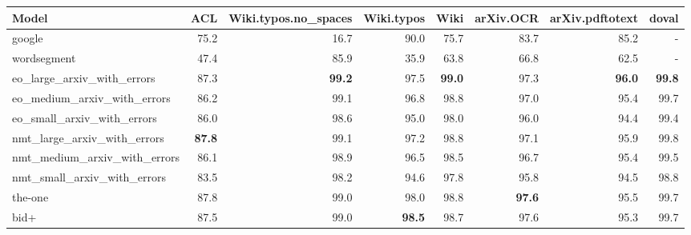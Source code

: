 \begin{tabular}{lrrrrrrr} \hline
Model & ACL & Wiki.typos.no\_spaces & Wiki.typos & Wiki & arXiv.OCR & arXiv.pdftotext & doval \\ \hline
google & 75.2 & 16.7 & 90.0 & 75.7 & 83.7 & 85.2 & - \\ 
wordsegment & 47.4 & 85.9 & 35.9 & 63.8 & 66.8 & 62.5 & - \\ \hline
eo\_large\_arxiv\_with\_errors & 87.3 & \textbf{99.2} & 97.5 & \textbf{99.0} & 97.3 & \textbf{96.0} & \textbf{99.8} \\ 
eo\_medium\_arxiv\_with\_errors & 86.2 & 99.1 & 96.8 & 98.8 & 97.0 & 95.4 & 99.7 \\ 
eo\_small\_arxiv\_with\_errors & 86.0 & 98.6 & 95.0 & 98.0 & 96.0 & 94.4 & 99.4 \\ \hline
nmt\_large\_arxiv\_with\_errors & \textbf{87.8} & 99.1 & 97.2 & 98.8 & 97.1 & 95.9 & 99.8 \\ 
nmt\_medium\_arxiv\_with\_errors & 86.1 & 98.9 & 96.5 & 98.5 & 96.7 & 95.4 & 99.5 \\ 
nmt\_small\_arxiv\_with\_errors & 83.5 & 98.2 & 94.6 & 97.8 & 95.8 & 94.5 & 98.8 \\ \hline
the-one & 87.8 & 99.0 & 98.0 & 98.8 & \textbf{97.6} & 95.5 & 99.7 \\ 
bid+ & 87.5 & 99.0 & \textbf{98.5} & 98.7 & 97.6 & 95.3 & 99.7 \\ \hline
\end{tabular}